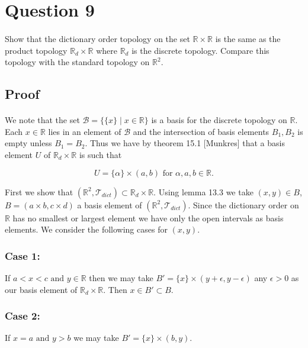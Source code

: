 \documentclass[11pt, oneside]{article}   	%
\newcommand{\R}{\mathbb{R}}
\newcommand{\scr}[1]{\mathscr{#1}}
\newcommand{\tand}{\text{ and }}
\newcommand{\tfor}{\text{ for }}
\newcommand{\st}{\mid}
\begin{document}
\section*{Question 9}
\paragraph{}

Show that the dictionary order topology on the set $\R \times \R$ is the same as the product topology $\R_d \times \R$ where $\R_d$ is the discrete topology. Compare this topology with the standard topology on $\R^2$.

\subsection*{Proof}
\paragraph{}

We note that the set $\scr{B} = \{ \{x\} \st x \in \R \}$ is a basis for the discrete topology on $\R$. Each $x \in \R$ lies in an element of $\scr{B}$ and the intersection of basis elements $B_1, B_2$ is empty unless $B_1 = B_2$. Thus we have by theorem 15.1 [Munkres] that a basis element $U$ of $\R_d \times \R$ is such that

\[
U = \{\alpha\} \times (a,b) \tfor \alpha, a ,b \in \R.
\]

First we show that $(\R^2 , \scr{T}_{dict}) \subset \R_d \times \R$. Using lemma 13.3 we take $(x, y) \in B$, $B = (a \times b, c \times d)$ a basis element of  $(\R^2 , \scr{T}_{dict})$. Since the dictionary order on $\R$ has no smallest or largest element we have only the open intervals as basis elements. We consider the following cases for $(x, y)$.

\subsubsection*{Case 1:}
If $a < x < c \tand y \in \R$ then we may take $B' = \{x\} \times (y+\epsilon, y-\epsilon)$ any $\epsilon > 0$ as our basis element of $\R_d \times \R$. Then $x \in B' \subset B$.

\subsubsection*{Case 2:}
If $x = a \tand y > b$ we may take $B' = \{x\} \times (b, y)$.
\end{document}
